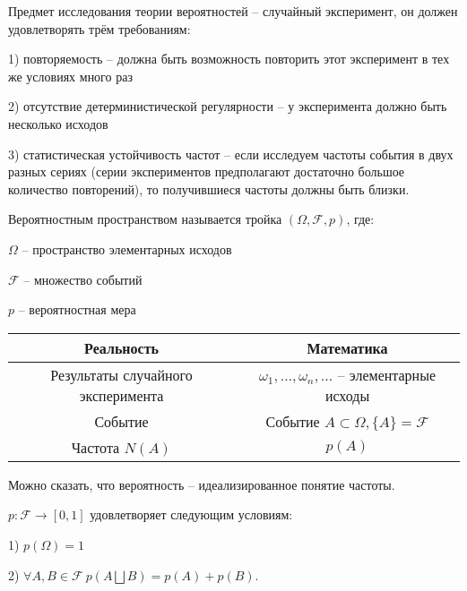 Предмет исследования теории вероятностей -- случайный эксперимент, он должен удовлетворять трём требованиям:

1) повторяемость -- должна быть возможность повторить этот эксперимент в тех же условиях много раз

2) отсутствие детерминистической регулярности -- у эксперимента должно быть несколько исходов

3) статистическая устойчивость частот -- если исследуем частоты события в двух разных сериях (серии экспериментов предполагают достаточно большое количество повторений), то получившиеся частоты должны быть близки.

Вероятностным пространством называется тройка $(\Omega, \mathcal{F}, p)$, где:

$\Omega$ -- пространство элементарных исходов

$\mathcal{F}$ -- множество событий

$p$ -- вероятностная мера


\begin{tabular}{c|c}
    Реальность & Математика \\
    \hline
    Результаты случайного эксперимента & $\omega_1, \ldots, \omega_n, \ldots$ 
    -- элементарные исходы \\
    \hline
    Событие & Событие $A \subset \Omega, \{ A \} = \mathcal{F}$ \\
    \hline
    Частота $N(A)$ & $p(A)$
    
\end{tabular}

Можно сказать, что вероятность -- идеализированное понятие частоты.

$p: \mathcal{F} \to [0, 1]$ удовлетворяет следующим условиям:

1) $p(\Omega) = 1$

2) $\forall A, B \in \mathcal{F} \ p(A \bigsqcup B) = p(A) + p(B)$.
